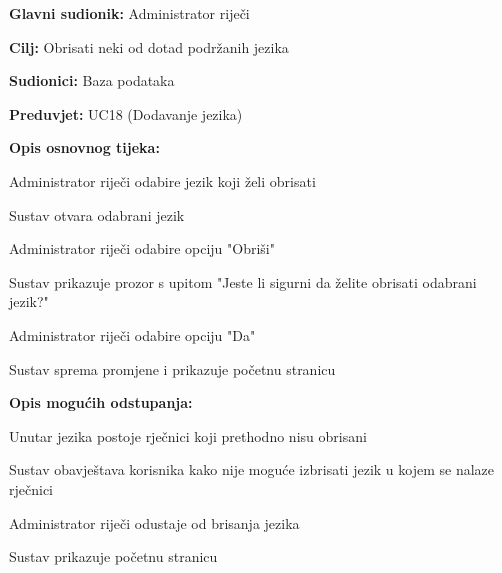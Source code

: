 				\noindent {}
				\begin{packed_item}
					
					\item \textbf{Glavni sudionik: }Administrator riječi
					\item  \textbf{Cilj:} Obrisati neki od dotad podržanih jezika
					\item  \textbf{Sudionici:} Baza podataka
					\item  \textbf{Preduvjet:} UC18 (Dodavanje jezika)
					\item  \textbf{Opis osnovnog tijeka:}
					
					\item[] \begin{packed_enum}
						
						\item Administrator riječi odabire jezik koji želi obrisati
						\item Sustav otvara odabrani jezik
						\item Administrator riječi odabire opciju "Obriši"
						\item Sustav prikazuje prozor s upitom "Jeste li sigurni da želite obrisati odabrani jezik?"
						\item Administrator riječi odabire opciju "Da"
						\item Sustav sprema promjene i prikazuje početnu stranicu
					
					\end{packed_enum}
					
					\item  \textbf{Opis mogućih odstupanja:}
					
					\item[] \begin{packed_item}
						
						\item[3.a] Unutar jezika postoje rječnici koji prethodno nisu obrisani
						\item[] \begin{packed_enum}
							
							\item Sustav obavještava korisnika kako nije moguće izbrisati jezik u kojem se nalaze rječnici
							
						\end{packed_enum}
						
						\item[4.a] Administrator riječi odustaje od brisanja jezika
						\item[] \begin{packed_enum}
							
							\item Sustav prikazuje početnu stranicu
							
						\end{packed_enum}
						
						
					\end{packed_item}
				\end{packed_item}
				
